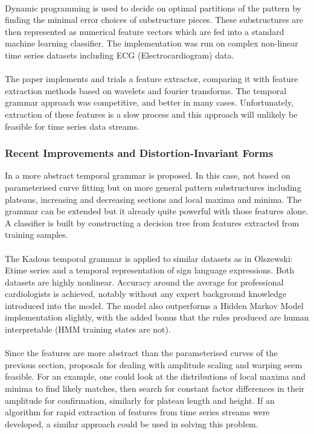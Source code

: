 	\paragraph{}
	Dynamic programming is used to decide on optimal partitions of the pattern by finding the minimal error choices of substructure pieces. These substructures are then represented as numerical feature vectors which are fed into a standard machine learning classifier. The implementation was run on complex non-linear time series datasets including ECG (Electrocardiogram) data. 
	\paragraph{}
	The paper implements and trials a feature extractor, comparing it with feature extraction methods based on wavelets and fourier transforms. The temporal grammar approach was competitive, and better in many cases. Unfortunately, extraction of these features is a slow process and this approach will unlikely be feasible for time series data streams.
	
	\subsubsection{Recent Improvements and Distortion-Invariant Forms}
	In \citep{kadous2005classification} a more abstract temporal grammar is proposed. In this case, not based on parameterised curve fitting but on more general pattern substructures including plateaus, increasing and decreasing sections and local maxima and minima. The grammar can be extended but it already quite powerful with those features alone. A classifier is built by constructing a decision tree from features extracted from training samples.
	\paragraph{}
	The Kadous temporal grammar is applied to similar datasets as in Olszewski: Etime series and a temporal representation of sign language expressions.  Both datasets are highly nonlinear. Accuracy around the average for professional cardiologists is achieved, notably without any expert background knowledge introduced into the model. The model also outperforms a Hidden Markov Model implementation slightly, with the added bonus that the rules produced are human interpretable (HMM training states are not). 
	\paragraph{}
	Since the features are more abstract than the parameterised curves of the previous section, proposals for dealing with amplitude scaling and warping seem feasible. For an example, one could look at the distributions of local maxima and minima to find likely matches, then search for constant factor differences in their amplitude for confirmation, similarly for plateau length and height. If an algorithm for rapid extraction of features from time series streams were developed, a similar approach could be used in solving this problem.
	
